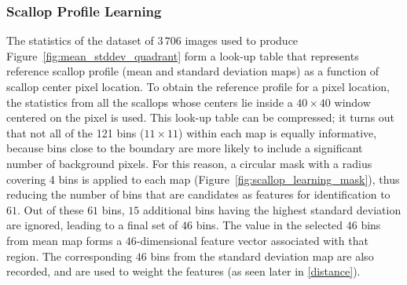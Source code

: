 \documentclass {udthesis}
\begin{document}
\subsubsection{Scallop Profile Learning} \label{subsubsec:scallop_profile_learning}

The statistics of the dataset of $3\,706$ images used to produce Figure~\ref{fig:mean_stddev_quadrant} form a look-up table that represents reference scallop profile (mean and standard deviation maps) 
as a function of scallop center pixel location.
To obtain the reference profile for a pixel location, 
the statistics from all the scallops whose centers lie inside a $40\times40$ window centered on the pixel is used.
This look-up table can be compressed; it turns out that not all of the 121 bins ($11\times11$) within each map is equally informative, because bins close to the boundary are more likely to include a significant number of background pixels.
For this reason, a circular mask with a radius covering 4 bins is applied to each map (Figure~\ref{fig:scallop_learning_mask}), thus reducing the number of bins that are candidates as features for identification to $61$.
Out of these $61$ bins, $15$ additional bins having the highest standard deviation are ignored, leading to a final set of $46$ bins.
The value in the selected $46$ bins from mean map forms a $46$-dimensional feature vector associated with that region. The corresponding $46$ bins from the standard deviation map are also recorded, and are used to weight the features
(as seen later in \eqref{distance}).
\end{document}
